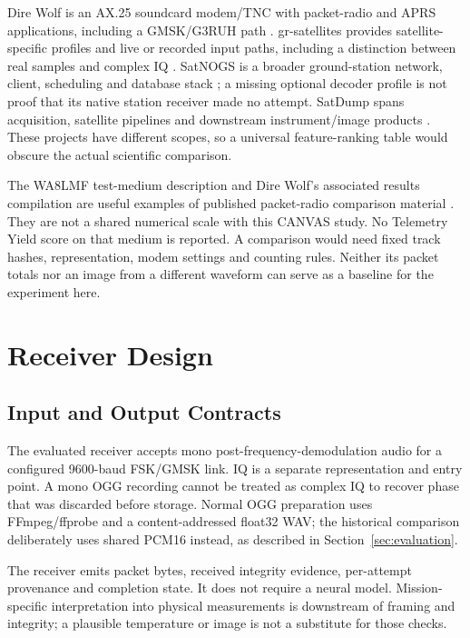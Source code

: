 \documentclass[journal]{IEEEtran}
\begin{document}
Dire Wolf is an AX.25 soundcard modem/TNC with packet-radio and APRS applications, including a GMSK/G3RUH path \cite{direwolf}. gr-satellites provides satellite-specific profiles and live or recorded input paths, including a distinction between real samples and complex IQ \cite{grsat}. SatNOGS is a broader ground-station network, client, scheduling and database stack \cite{satnogs}; a missing optional decoder profile is not proof that its native station receiver made no attempt. SatDump spans acquisition, satellite pipelines and downstream instrument/image products \cite{satdump}. These projects have different scopes, so a universal feature-ranking table would obscure the actual scientific comparison.

The WA8LMF test-medium description and Dire Wolf's associated results compilation are useful examples of published packet-radio comparison material \cite{wa8lmf,direwolfresults}. They are not a shared numerical scale with this CANVAS study. No Telemetry Yield score on that medium is reported. A comparison would need fixed track hashes, representation, modem settings and counting rules. Neither its packet totals nor an image from a different waveform can serve as a baseline for the experiment here.

\section{Receiver Design}
\subsection{Input and Output Contracts}
The evaluated receiver accepts mono post-frequency-demodulation audio for a configured 9600-baud FSK/GMSK link. IQ is a separate representation and entry point. A mono OGG recording cannot be treated as complex IQ to recover phase that was discarded before storage. Normal OGG preparation uses FFmpeg/ffprobe and a content-addressed float32 WAV; the historical comparison deliberately uses shared PCM16 instead, as described in Section~\ref{sec:evaluation}.

The receiver emits packet bytes, received integrity evidence, per-attempt provenance and completion state. It does not require a neural model. Mission-specific interpretation into physical measurements is downstream of framing and integrity; a plausible temperature or image is not a substitute for those checks.
\end{document}
